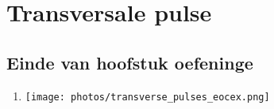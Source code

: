 \section{Transversale pulse}
% 

\subsection{Einde van hoofstuk oefeninge} 

\begin{enumerate}[noitemsep, label=\textbf{\arabic*}. ] 
\item %
\texttt{[image: photos/transverse\_pulses\_eocex.png]}
\end{enumerate}

